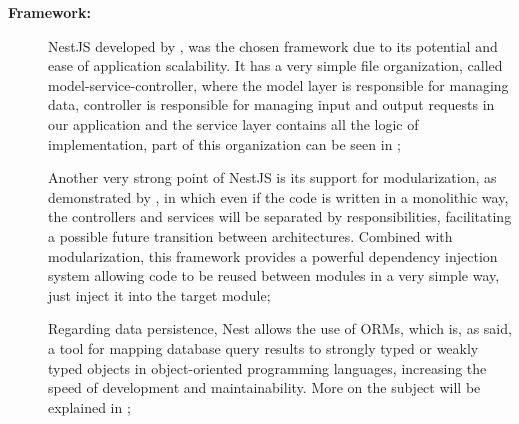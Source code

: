 \begin{description}
    \item[\textbf{Framework:}] NestJS developed by \textcite{nestDocs}, was the chosen framework due to its potential and ease of application scalability. It has a very simple file organization, called model-service-controller, where the model layer is responsible for managing data, controller is responsible for managing input and output requests in our application and the service layer contains all the logic of implementation, part of this organization can be seen in ;
    
    
    Another very strong point of NestJS is its support for modularization, as demonstrated by \textcite{nestDocs},  in which even if the code is written in a monolithic way, the controllers and services will be separated by responsibilities, facilitating a possible future transition between architectures. Combined with modularization, this framework provides a powerful dependency injection system allowing code to be reused between modules in a very simple way, just inject it into the target module;
    
    
    Regarding data persistence, Nest allows the use of \acp{ORM}, which is, as \textcite{Wiphusitphunpol_2017} said, a tool for mapping database query results to strongly typed or weakly typed objects in object-oriented programming languages, increasing the speed of development and maintainability. More on the subject will be explained in ;
    

\end{description}
